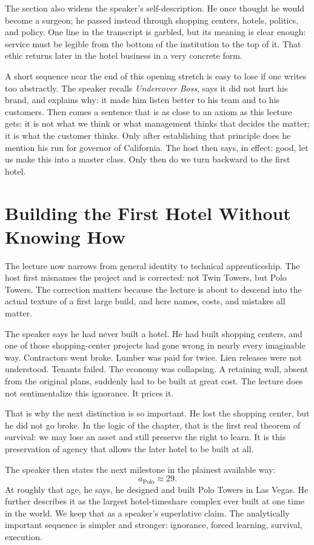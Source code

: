 The section also widens the speaker's self-description. He once thought he would become a surgeon; he passed instead through shopping centers, hotels, politics, and policy. One line in the transcript is garbled, but its meaning is clear enough: service must be legible from the bottom of the institution to the top of it. That ethic returns later in the hotel business in a very concrete form.

A short sequence near the end of this opening stretch is easy to lose if one writes too abstractly. The speaker recalls \emph{Undercover Boss}, says it did not hurt his brand, and explains why: it made him listen better to his team and to his customers. Then comes a sentence that is as close to an axiom as this lecture gets: it is not what we think or what management thinks that decides the matter; it is what the customer thinks. Only after establishing that principle does he mention his run for governor of California. The host then says, in effect: good, let us make this into a master class. Only then do we turn backward to the first hotel.

\section{Building the First Hotel Without Knowing How}

The lecture now narrows from general identity to technical apprenticeship. The host first misnames the project and is corrected: not Twin Towers, but Polo Towers. The correction matters because the lecture is about to descend into the actual texture of a first large build, and here names, costs, and mistakes all matter.

The speaker says he had never built a hotel. He had built shopping centers, and one of those shopping-center projects had gone wrong in nearly every imaginable way. Contractors went broke. Lumber was paid for twice. Lien releases were not understood. Tenants failed. The economy was collapsing. A retaining wall, absent from the original plans, suddenly had to be built at great cost. The lecture does not sentimentalize this ignorance. It prices it.

That is why the next distinction is so important. He lost the shopping center, but he did not go broke. In the logic of the chapter, that is the first real theorem of survival: we may lose an asset and still preserve the right to learn. It is this preservation of agency that allows the later hotel to be built at all.

The speaker then states the next milestone in the plainest available way:
\begin{equation}
a_{\mathrm{Polo}}\approx 29.
\end{equation}
At roughly that age, he says, he designed and built Polo Towers in Las Vegas. He further describes it as the largest hotel-timeshare complex ever built at one time in the world. We keep that as a speaker's superlative claim. The analytically important sequence is simpler and stronger: ignorance, forced learning, survival, execution.


